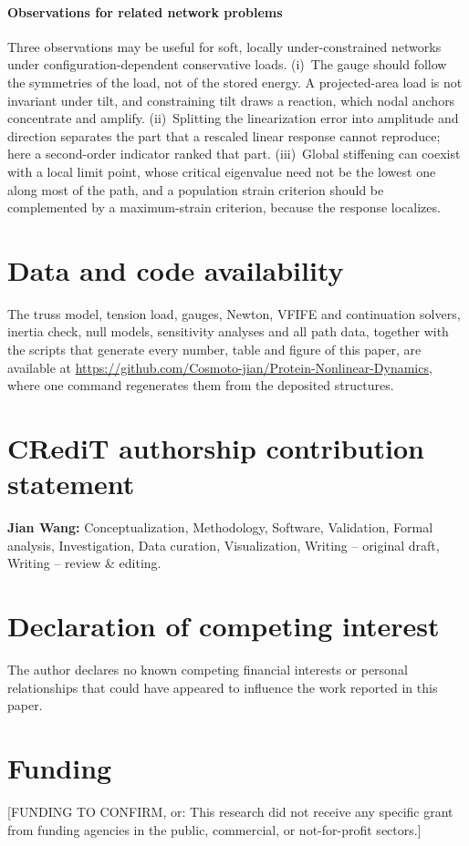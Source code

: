 \documentclass[preprint,12pt,a4paper]{elsarticle}
\begin{document}
\paragraph{Observations for related network problems} Three observations may be useful for soft, locally under-constrained networks under configuration-dependent conservative loads. (i)~The gauge should follow the symmetries of the load, not of the stored energy. A projected-area load is not invariant under tilt, and constraining tilt draws a reaction, which nodal anchors concentrate and amplify. (ii)~Splitting the linearization error into amplitude and direction separates the part that a rescaled linear response cannot reproduce; here a second-order indicator ranked that part. (iii)~Global stiffening can coexist with a local limit point, whose critical eigenvalue need not be the lowest one along most of the path, and a population strain criterion should be complemented by a maximum-strain criterion, because the response localizes.

\section*{Data and code availability}
The truss model, tension load, gauges, Newton, VFIFE and continuation solvers, inertia check, null models, sensitivity analyses and all path data, together with the scripts that generate every number, table and figure of this paper, are available at \url{https://github.com/Cosmoto-jian/Protein-Nonlinear-Dynamics}, where one command regenerates them from the deposited structures.

\section*{CRediT authorship contribution statement}
\textbf{Jian Wang:} Conceptualization, Methodology, Software, Validation, Formal analysis, Investigation, Data curation, Visualization, Writing -- original draft, Writing -- review \& editing.

\section*{Declaration of competing interest}
The author declares no known competing financial interests or personal relationships that could have appeared to influence the work reported in this paper.

\section*{Funding}
[FUNDING TO CONFIRM, or: This research did not receive any specific grant from funding agencies in the public, commercial, or not-for-profit sectors.]
\end{document}
